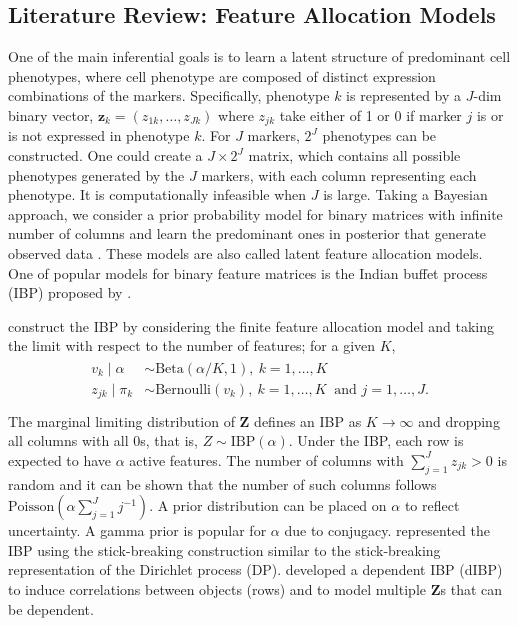 \documentclass[12pt,]{article}
\def\Z{\bm{Z}}
\begin{document}
\subsection{Literature Review: Feature Allocation Models}\label{literature-review}
One of the main inferential goals is  to learn a latent structure of predominant cell phenotypes, where cell phenotype are composed of distinct expression combinations of the markers. Specifically, phenotype $k$ is represented by a $J$-dim binary vector, $\bm z_k=(z_{1k}, \ldots, z_{Jk})$ where $z_{jk}$ take either of 1 or 0 if marker $j$ is or is not expressed in phenotype $k$.  For \(J\) markers, \(2^J\) phenotypes can be constructed.
One could create a \(J \times 2^J\) matrix, which contains all possible
phenotypes generated by the \(J\) markers, with each column representing 
each phenotype. It is computationally infeasible when \(J\) is large. Taking a Bayesian approach, we consider a prior probability model for binary matrices with infinite number of columns and learn the predominant ones in posterior that  generate observed data . %
These models are also called latent feature allocation models.  One of popular models for binary feature matrices is the Indian buffet process (IBP) proposed by \citet{griffiths2011indian}. 

\citet{griffiths2011indian} construct the IBP by considering the finite feature allocation
model and taking the limit with respect to the number of features; for a given $K$,
\begin{align}
\begin{split}
v_k \mid \alpha &\sim \text{Beta}(\alpha/K, 1),~ k=1, \ldots, K \\
z_{jk} \mid \pi_k &\sim \text{Bernoulli}(v_k),~ k=1, \ldots, K~\mbox{ and } j=1, \ldots, J. \\
\end{split}
\label{eq:ibp}
\end{align}
The marginal limiting distribution of $\Z$ defines an IBP as $K \rightarrow
\infty$ and dropping all columns with all 0s, that is,  \(Z \sim
\text{IBP}(\alpha)\). Under the IBP, each row is expected to have  \(\alpha\)
active features.  The number of columns with $\sum_{j=1}^J z_{jk} >0$ is random
and it can be shown that the number of such columns follows
\(\text{Poisson}(\alpha \sum_{j=1}^J j^{-1})\).   A prior distribution can be
placed on \(\alpha\) to reflect uncertainty. A gamma prior is popular for
$\alpha$ due to conjugacy.  \citet{teh2007stick} represented the IBP using the
stick-breaking construction similar to the stick-breaking representation of the
Dirichlet process (DP).  \citet{williamson2010dependent} developed a dependent
IBP (dIBP) to induce correlations between objects
(rows) and to model multiple $\Z$s that can be dependent.
\end{document}

